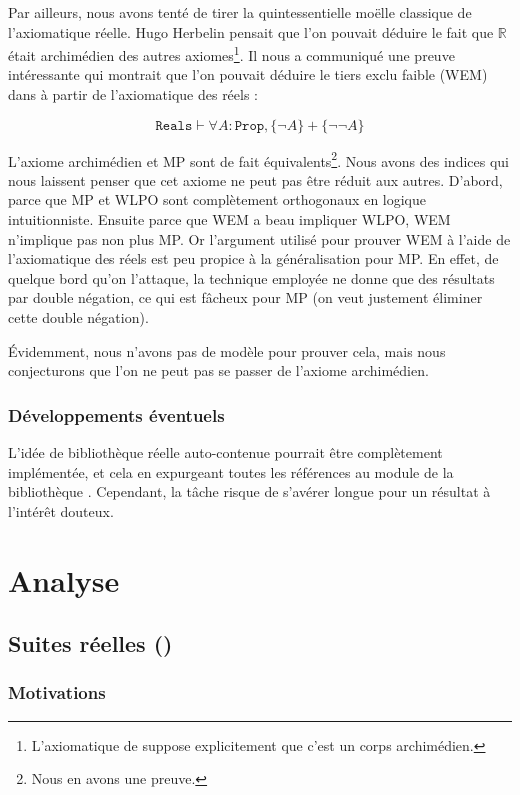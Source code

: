 Par ailleurs, nous avons tenté de tirer la quintessentielle moëlle classique de l'axiomatique réelle. Hugo Herbelin pensait que l'on pouvait déduire le fait que $\mathbb{R}$ était archimédien des autres axiomes\footnote{L'axiomatique de \Coq{} suppose explicitement que c'est un corps archimédien.}. Il nous a communiqué une preuve intéressante qui montrait que l'on pouvait déduire le tiers exclu faible (WEM) dans  à partir de l'axiomatique des réels :

$$\mathtt{Reals}\vdash\forall A : \mathtt{Prop}, \{\neg A\} + \{\neg\neg A\}$$

L'axiome archimédien et MP sont de fait équivalents\footnote{Nous en avons une preuve.}. Nous avons des indices qui nous laissent penser que cet axiome ne peut pas être réduit aux autres. D'abord, parce que MP et WLPO sont complètement orthogonaux en logique intuitionniste. Ensuite parce que WEM a beau impliquer WLPO, WEM n'implique pas non plus MP. Or l'argument utilisé pour prouver WEM à l'aide de l'axiomatique des réels est peu propice à la généralisation pour MP. En effet, de quelque bord qu'on l'attaque, la technique employée ne donne que des résultats par double négation, ce qui est fâcheux pour MP (on veut justement éliminer cette double négation).

Évidemment, nous n'avons pas de modèle pour prouver cela, mais nous conjecturons que l'on ne peut pas se passer de l'axiome archimédien.

\subsubsection{Développements éventuels}

L'idée de bibliothèque réelle auto-contenue pourrait être complètement implémentée, et cela en expurgeant toutes les références au module  de la bibliothèque . Cependant, la tâche risque de s'avérer longue pour un résultat à l'intérêt douteux.

\section{Analyse}

\subsection{Suites réelles ()}

\subsubsection{Motivations}

